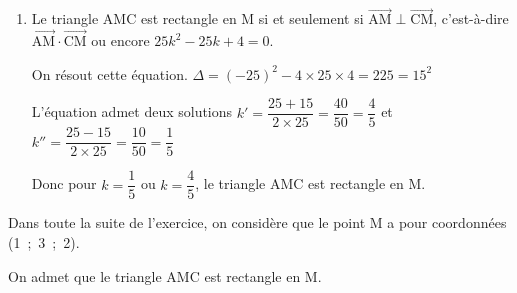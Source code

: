 \documentclass[10pt]{article}
\providecommand{\vect}[1]{\overrightarrow{#1}}
\begin{document}
\begin{enumerate}
\begin{enumerate}
		\item 
Le triangle AMC est rectangle en M si et seulement si $\vect{\text{AM}} \perp \vect{\text{CM}}$, c'est-à-dire $\vect{\text{AM}} \cdot \vect{\text{CM}}$ ou encore $25k^2-25k+4=0$.		
		
On résout cette équation.
$\Delta = (-25)^2-4\times 25\times 4 = 225 = 15^{2}$

L'équation admet deux solutions 
$k'=\dfrac{25+15}{2\times 25} = \dfrac{40}{50}=\dfrac{4}{5}$
et
$k''=\dfrac{25-15}{2\times 25} = \dfrac{10}{50}=\dfrac{1}{5}$

Donc pour $k=\dfrac{1}{5}$ ou $k=\dfrac{4}{5}$, le triangle AMC est rectangle en M.
		
	\end{enumerate}
\end{enumerate}	

Dans toute la suite de l'exercice, on considère que le point M a pour coordonnées (1~;~3~;~2).

On admet que le triangle AMC est rectangle en M.
\end{document}

